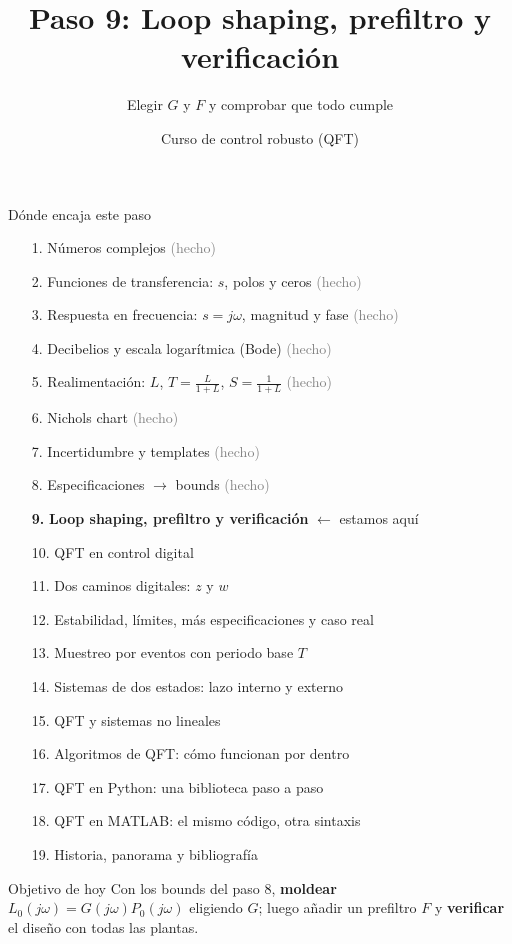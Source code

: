 \documentclass[aspectratio=169,11pt]{beamer}
\title[Loop shaping]{Paso 9: Loop shaping, prefiltro y verificación}
\subtitle{Elegir $G$ y $F$ y comprobar que todo cumple}
\author{Curso de control robusto (QFT)}
\date{}
\begin{document}
\begin{frame}\titlepage\end{frame}

\begin{frame}{Dónde encaja este paso}
  \tiny
  \begin{enumerate}\setlength{\itemsep}{-2pt}
    \item[1.] Números complejos \hfill \textcolor{gray}{(hecho)}
    \item[2.] Funciones de transferencia: $s$, polos y ceros \hfill \textcolor{gray}{(hecho)}
    \item[3.] Respuesta en frecuencia: $s=j\omega$, magnitud y fase \hfill \textcolor{gray}{(hecho)}
    \item[4.] Decibelios y escala logarítmica (Bode) \hfill \textcolor{gray}{(hecho)}
    \item[5.] Realimentación: $L$, $T=\frac{L}{1+L}$, $S=\frac{1}{1+L}$ \hfill \textcolor{gray}{(hecho)}
    \item[6.] Nichols chart \hfill \textcolor{gray}{(hecho)}
    \item[7.] Incertidumbre y templates \hfill \textcolor{gray}{(hecho)}
    \item[8.] Especificaciones $\rightarrow$ bounds \hfill \textcolor{gray}{(hecho)}
    \item[\textbf{9.}] \textbf{Loop shaping, prefiltro y verificación} \hfill $\leftarrow$ estamos aquí
    \item[10.] QFT en control digital
    \item[11.] Dos caminos digitales: $z$ y $w$
    \item[12.] Estabilidad, límites, más especificaciones y caso real
    \item[13.] Muestreo por eventos con periodo base $T$
    \item[14.] Sistemas de dos estados: lazo interno y externo
    \item[15.] QFT y sistemas no lineales
    \item[16.] Algoritmos de QFT: cómo funcionan por dentro
    \item[17.] QFT en Python: una biblioteca paso a paso
    \item[18.] QFT en MATLAB: el mismo código, otra sintaxis
    \item[19.] Historia, panorama y bibliografía
  \end{enumerate}
  \vspace{2pt}
  \begin{block}{Objetivo de hoy}
    Con los bounds del paso 8, \textbf{moldear} $L_0(j\omega)=G(j\omega)P_0(j\omega)$ eligiendo $G$; luego añadir un prefiltro $F$ y \textbf{verificar} el diseño con todas las plantas.
  \end{block}
\end{frame}
\end{document}
